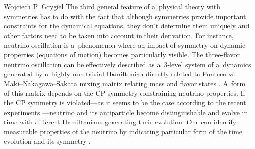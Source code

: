 \begin{artengenv}{Wojciech P. Grygiel}
The third general feature of a~physical theory with symmetries has to do with the fact that although symmetries provide important constraints for the dynamical equations, they don't determine them uniquely and other factors need to be taken into account in their derivation. For instance, neutrino oscillation is a~phenomenon where an impact of symmetry on dynamic properties (equations of motion) becomes particularly visible. The three-flavor neutrino oscillation can be effectively described as a~3-level system of a~dynamics generated by a~highly non-trivial Hamiltonian directly related to Pontecorvo–Maki–Nakagawa–Sakata mixing matrix relating mass and flavor states 
\parencites[e.g.,][]{banerjee_quantum-information_2015}[][]{bilenky_neutrino_2016}. %
 A~form of this matrix depends on the CP symmetry constraining neutrino properties. If the CP symmetry is violated---as it seems to be the case according to the recent experiments 
\parencite[e.g.,][]{the_t2k_collaboration_constraint_2020}%
---neutrino and its antiparticle become distinguishable and evolve in time with different Hamiltonians generating their evolution. One can identify measurable properties of the neutrino by indicating particular form of the time evolution and its symmetry 
\parencite[e.g.,][]{richter_leggett-garg_2017}.%





\end{artengenv}
